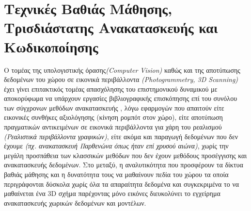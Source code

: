 \section{Τεχνικές Βαθιάς Μάθησης, Τρισδιάστατης Ανακατασκευής και Κωδικοποίησης}
\label{section:sotaintro}
\par
    Ο τομέας της υπολογιστικής όρασης\textit{(Computer Vision)} καθώς και της αποτύπωσης  δεδομένων του χώρου σε εικονικά περιβάλλοντα \textit{(Photogrammetry, 3D Scanning)} έχει γίνει επιτακτικός τομέας απασχόλησης του επιστημονικού δυναμικού με αποκορύφωμα να υπάρχουν εργασίες βιβλιογραφικής επισκόπησης επί του συνόλου των σύγχρονων μεθόδων ανακατασκευής \cite{chen2023review}, λόγω εφαρμογών που απαιτούν είτε εικονικές συνθήκες αξιολόγησης (κίνηση ρομπότ στον χώρο), είτε αποτύπωση πραγματικών αντικειμένων σε εικονικά περιβάλλοντα για χάρη του ρεαλισμού \textit{(Ρεαλιστικά περιβάλλοντα γραφικών)}, είτε ακόμα και παραγωγή  δεδομένων που δεν έχουμε \textit{(πχ. ανακατασκευή Παρθενώνα όπως ήταν επί χρυσού αιώνα)}, χωρίς την μεγάλη προσπάθεια των κλασσικών μεθόδων που δεν έχουν μεθόδους προσέγγισης και ανακατασκευής δεδομένων. Στο μεταξύ, η αναλυτικότητα που προσφέρουν τα δίκτυα βαθιάς μάθησης και η δυνατότητα τους να μαθαίνουν πεδία του χώρου τα οποία περιγράφονται δύσκολα χωρίς όλα τα απαραίτητα δεδομένα και συγκεκριμένα το να μαθαίνεται ένα 3D σχήμα παρέχοντας μόνο εικόνες διευκολύνει το εγχείρημα ανακατασκευής χωρικών δεδομένων και μοντέλων.


